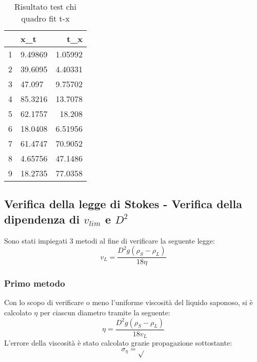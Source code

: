 \documentclass[a4paper,11pt,oneside]{article}
\begin{document}
\begin{table}[h!]
\centering
\begin{tabular}{|l|l|r|}
\hline
  & x\_t    & t\_x  \\ \hline
1 & 9.49869 & 1.05992                   \\ \hline
2 & 39.6095 & 4.40331                   \\ \hline
3 & 47.097  & 9.75702                   \\ \hline
4 & 85.3216 & 13.7078                   \\ \hline
5 & 62.1757 & 18.208                    \\ \hline
6 & 18.0408 & 6.51956                   \\ \hline
7 & 61.4747 & 70.9052                   \\ \hline
8 & 4.65756 & 47.1486                   \\ \hline
9 & 18.2735 & 77.0358                   \\ \hline
\end{tabular}
\caption{Risultato test chi quadro fit t-x}
\label{tab:test_chi_fit_x_t}
\end{table}


 
 



\subsection{Verifica della legge di Stokes - Verifica della dipendenza di $v_{lim}$ e $D^2$}
Sono stati impiegati 3 metodi al fine di verificare la seguente legge:
\begin{equation*}
    v_{L}= \frac{{D}^2g\left(\rho_S - \rho_L\right)}{18 \eta }
\end{equation*}

\subsubsection{Primo metodo}
Con lo scopo di verificare o meno l'uniforme viscosità del liquido saponoso, si è calcolato $\eta$ per ciascun diametro tramite la seguente:
\begin{equation}
\eta= \frac{{D}^2g\left(\rho_S - \rho_L\right)}{18 v_{L} } 
\end{equation}
L'errore della viscosità è stato calcolato grazie propagazione sottostante:
\begin{equation*}
    \sigma_{\eta}=\sqrt{}
\end{equation*}
\end{document}
